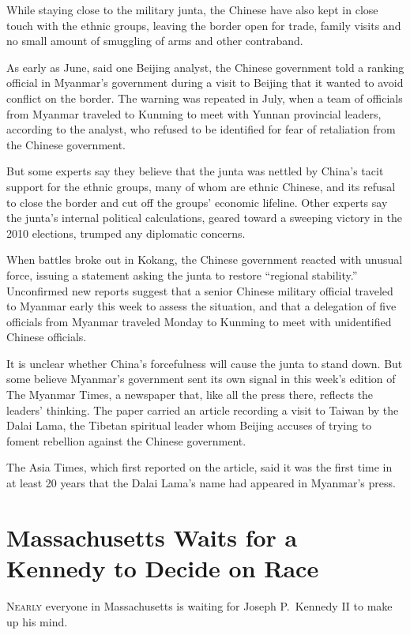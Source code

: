 ﻿\documentclass[12pt]{article}
\begin{document}
While staying close to the military junta, the Chinese have also kept in close touch with the ethnic
groups, leaving the border open for trade, family visits and no small amount of smuggling of arms
and other contraband.

As early as June, said one Beijing analyst, the Chinese government told a ranking official in
Myanmar's government during a visit to Beijing that it wanted to avoid conflict on the border. The
warning was repeated in July, when a team of officials from Myanmar traveled to Kunming to meet with
Yunnan provincial leaders, according to the analyst, who refused to be identified for fear of
retaliation from the Chinese government.

But some experts say they believe that the junta was nettled\cite{nettle} by China's
tacit\cite{tacit} support for the ethnic groups, many of whom are ethnic Chinese, and its refusal to
close the border and cut off the groups' economic lifeline. Other experts say the junta's internal
political calculations, geared toward a sweeping victory in the 2010 elections, trumped\cite{trump}
any diplomatic concerns.

When battles broke out in Kokang, the Chinese government reacted with unusual force, issuing a
statement asking the junta to restore ``regional stability.'' Unconfirmed new reports suggest that a
senior Chinese military official traveled to Myanmar early this week to assess the situation, and
that a delegation of five officials from Myanmar traveled Monday to Kunming to meet with
unidentified Chinese officials.

It is unclear whether China's forcefulness will cause the junta to stand down. But some believe
Myanmar's government sent its own signal in this week's edition of The Myanmar Times, a newspaper
that, like all the press there, reflects the leaders' thinking. The paper carried an article
recording a visit to Taiwan by the Dalai Lama, the Tibetan spiritual leader whom Beijing accuses of
trying to foment rebellion against the Chinese government.

The Asia Times, which first reported on the article, said it was the first time in at least 20 years
that the Dalai Lama's name had appeared in Myanmar's press.

\section{Massachusetts Waits for a Kennedy to Decide on Race}

\lettrine{N}{early} everyone in Massachusetts is waiting for Joseph P.~Kennedy II to make up his
mind.
\end{document}

